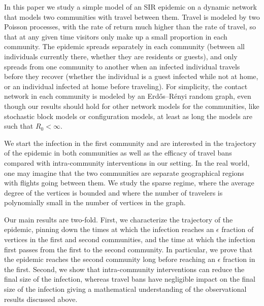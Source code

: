 \documentclass[11pt]{article}
\begin{document}
In this paper we study a simple model of an SIR epidemic on a dynamic network that models two communities with travel between them. Travel is modeled by two Poisson processes, with the rate of return much higher than the rate of travel, so that at any given time visitors only make up a small proportion in each community.  The epidemic spreads separately in each community (between all individuals currently there, whether they are residents or guests), and only spreads from one community to another when an infected individual travels before they recover (whether the individual is a guest infected while not at home, or an individual infected at home before traveling).  For simplicity, the contact network in each community is modeled by an Erd\H{o}s--R\'enyi random graph, even though our results should hold for other network models for the communities, like stochastic block models or configuration models, at least as long the models are such that $R_0<\infty$.


We start the infection in the first community and are interested in the trajectory of the epidemic in both communities as well as the efficacy of travel bans compared with intra-community interventions in our setting. In the real world, one may imagine that the two communities are separate geographical regions with flights going between them. We study the sparse regime, where the average degree of the vertices is bounded and where the number of travelers is polynomially small in the number of vertices in the graph. 

Our main results are two-fold. First, we characterize the trajectory of the epidemic, pinning down the times at which the infection reaches an $\epsilon$ fraction of vertices in the first and second communities, and the time at which the infection first passes from the first to the second community. In particular, we prove that the epidemic reaches the second community long before reaching an $\epsilon$ fraction in the first. Second, we show that intra-community interventions can reduce the final size of the infection, whereas travel bans have negligible impact on the final size of the infection giving a mathematical understanding of the observational results discussed above.
\end{document}

